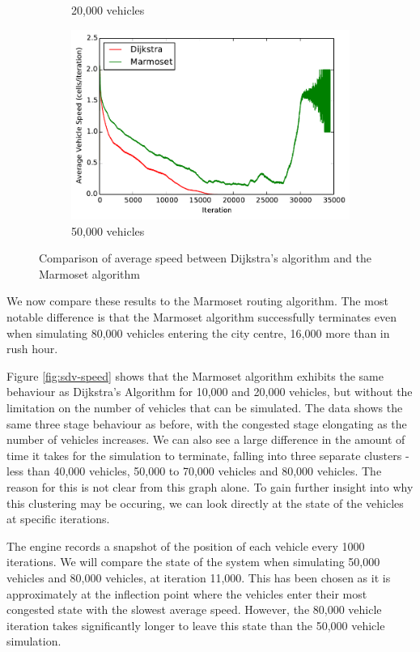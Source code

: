 \documentclass[ %
                    author={Alexander Hill},
                supervisor={Dr. Benjamin Sach},
                    degree={MEng},
                     title={MARMOSET},
                  subtitle={Multi-Agent Route Management using Online Simulation for Efficient Transportation},
                      type={research},
                      year={2016} ]{dissertation}
\begin{document}
\begin{figure}[p]
\begin{subfigure}[b]{0.3\textwidth}
        \caption{20,000 vehicles}
    \end{subfigure}
    \begin{subfigure}[b]{0.3\textwidth}
        \centering
        \includegraphics[width=\textwidth]{sdv-dij-comp-50k}
        \caption{50,000 vehicles}
    \end{subfigure}
    \caption{Comparison of average speed between Dijkstra's algorithm and the Marmoset algorithm}\label{fig:sdv-dij-comp}
\end{figure}

We now compare these results to the Marmoset routing algorithm. The most
notable difference is that the Marmoset algorithm successfully terminates even
when simulating 80,000 vehicles entering the city centre, 16,000 more than in
rush hour.

Figure \ref{fig:sdv-speed} shows that the Marmoset algorithm exhibits the same
behaviour as Dijkstra's Algorithm for 10,000 and 20,000 vehicles, but without
the limitation on the number of vehicles that can be simulated. The data
shows the same three stage behaviour as before, with the congested stage
elongating as the number of vehicles increases. We can also see a large
difference in the amount of time it takes for the simulation to terminate,
falling into three separate clusters - less than 40,000 vehicles, 50,000 to
70,000 vehicles and 80,000 vehicles. The reason for this is not clear from this
graph alone. To gain further insight into why this clustering may be occuring,
we can look directly at the state of the vehicles at specific iterations.

The engine records a snapshot of the position of each vehicle every 1000
iterations. We will compare the state of the system when simulating 50,000
vehicles and 80,000 vehicles, at iteration 11,000. This has been chosen as it is
approximately at the inflection point where the vehicles enter their most
congested state with the slowest average speed. However, the 80,000 vehicle
iteration takes significantly longer to leave this state than the 50,000 vehicle
simulation.
\end{document}
